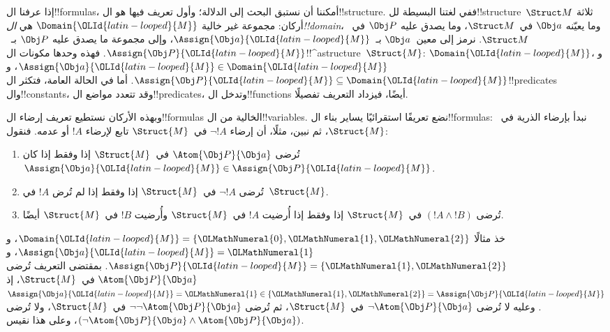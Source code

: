 \documentclass[../../../include/open-logic-section]{subfiles}
\begin{document}


إذا عرفنا ال!!{formula}s، أمكننا أن نستبق البحث إلى الدلالة؛ وأول
تعريف فيها هو ال!!{structure}. ففي لغتنا البسيطة لل!!{structure}~$\Struct M$
ثلاثة أركان: مجموعة غير خالية $\Domain{\OLId{latin-looped}{M}}$ هي
\emph{ال!!{domain}}، وما يعيّنه $\Obj a$ في~$\Struct M$، وما
يصدق عليه $\Obj P$ في~$\Struct M$. نرمز إلى معين~$\Obj a$
بـ~$\Assign{\Obj a}{\OLId{latin-looped}{M}}$، وإلى مجموعة ما يصدق عليه $\Obj P$
بـ~$\Assign{\Obj P}{\OLId{latin-looped}{M}}$. فهذه وحدها مكونات
ال!!^a{structure}~$\Struct{M}$: $\Domain{\OLId{latin-looped}{M}}$،
و$\Assign{\Obj a}{\OLId{latin-looped}{M}} \in \Domain{\OLId{latin-looped}{M}}$،
و$\Assign{\Obj P}{\OLId{latin-looped}{M}} \subseteq \Domain{\OLId{latin-looped}{M}}$. أما في الحالة العامة،
فتكثر ال!!{predicate}s وال!!{constant}s، وقد تتعدد مواضع
ال!!{predicate}s، وتدخل ال!!{function}s أيضًا، فيزداد التعريف
تفصيلًا.

وبهذه الأركان نستطيع تعريف إرضاء ال!!{formula}s الخالية من
ال!!{variable}s. نضع تعريفًا استقرائيًا يساير بناء ال!!{formula}s:
نبدأ بإرضاء الذرية في~$\Struct{M}$، ثم نبين، مثلًا، أن إرضاء
$\lnot !A$ في~$\Struct{M}$ تابع لإرضاء $!A$ أو عدمه. فنقول:

\begin{enumerate}
  \item تُرضى $\Atom{\Obj P}{\Obj a}$ في~$\Struct{M}$ إذا وفقط إذا
  كان $\Assign{\Obj a}{\OLId{latin-looped}{M}} \in \Assign{\Obj P}{\OLId{latin-looped}{M}}$.
  \item تُرضى $\lnot !A$ في~$\Struct{M}$ إذا وفقط إذا لم تُرض
  $!A$ في~$\Struct{M}$.
  \item تُرضى $(!A \land !B)$ في~$\Struct{M}$ إذا وفقط إذا أُرضيت
  $!A$ في~$\Struct{M}$ وأُرضيت $!B$ في~$\Struct{M}$ أيضًا.
\end{enumerate}
خذ مثالًا $\Domain{\OLId{latin-looped}{M}} = \{\OLMathNumeral{0}, \OLMathNumeral{1}, \OLMathNumeral{2}\}$،
و$\Assign{\Obj a}{\OLId{latin-looped}{M}} = \OLMathNumeral{1}$،
و$\Assign{\Obj P}{\OLId{latin-looped}{M}} = \{\OLMathNumeral{1}, \OLMathNumeral{2}\}$. بمقتضى التعريف تُرضى
$\Atom{\Obj P}{\Obj a}$ في~$\Struct{M}$، إذ
$\Assign{\Obj a}{\OLId{latin-looped}{M}} =  \OLMathNumeral{1} \in \{\OLMathNumeral{1},\OLMathNumeral{2}\} = \Assign{\Obj P}{\OLId{latin-looped}{M}}$.
وعليه لا تُرضى $\lnot \Atom{\Obj P}{\Obj a}$ في~$\Struct{M}$،
ثم تُرضى $\lnot\lnot \Atom{\Obj P}{\Obj a}$ في~$\Struct{M}$،
ولا تُرضى
$(\lnot \Atom{\Obj P}{\Obj a} \land \Atom{\Obj P}{\Obj a})$،
وعلى هذا نقيس.
\end{document}
